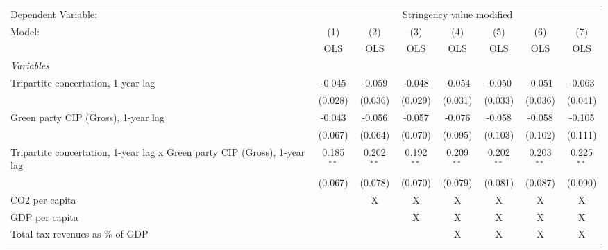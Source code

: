 
\begingroup
\centering
\begin{tabular}{lccccccc}
   \toprule
   Dependent Variable: & \multicolumn{7}{c}{Stringency value modified}\\
   Model:                                                                    & (1)          & (2)          & (3)          & (4)          & (5)          & (6)          & (7)\\  
                                                                             &  OLS         & OLS          & OLS          & OLS          & OLS          & OLS          & OLS\\  
   \midrule
   \emph{Variables}\\
   Tripartite concertation, 1-year lag                                       & -0.045       & -0.059       & -0.048       & -0.054       & -0.050       & -0.051       & -0.063\\   
                                                                             & (0.028)      & (0.036)      & (0.029)      & (0.031)      & (0.033)      & (0.036)      & (0.041)\\   
   Green party CIP (Gross), 1-year lag                                       & -0.043       & -0.056       & -0.057       & -0.076       & -0.058       & -0.058       & -0.105\\   
                                                                             & (0.067)      & (0.064)      & (0.070)      & (0.095)      & (0.103)      & (0.102)      & (0.111)\\   
   Tripartite concertation, 1-year lag x Green party CIP (Gross), 1-year lag & 0.185$^{**}$ & 0.202$^{**}$ & 0.192$^{**}$ & 0.209$^{**}$ & 0.202$^{**}$ & 0.203$^{**}$ & 0.225$^{**}$\\   
                                                                             & (0.067)      & (0.078)      & (0.070)      & (0.079)      & (0.081)      & (0.087)      & (0.090)\\   
   CO2 per capita                                                            &              & X            & X            & X            & X            & X            & X\\  
   GDP per capita                                                            &              &              & X            & X            & X            & X            & X\\  
   Total tax revenues as \% of GDP                                           &              &              &              & X            & X            & X            & X\\  

\end{tabular}
